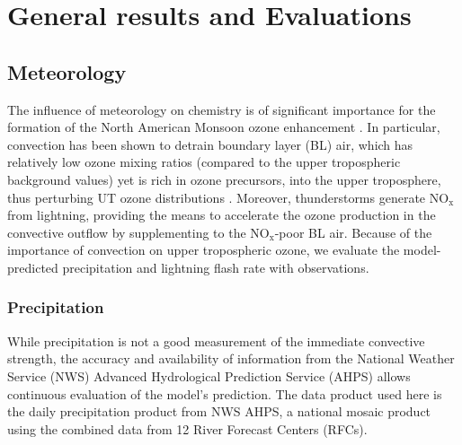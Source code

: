 \section{General results and Evaluations}\label{sect:results}

\subsection{Meteorology}\label{sect:val/met}

The influence of meteorology on chemistry is of significant importance for the formation of
the North American Monsoon ozone enhancement \citep{Li:2005ss,Cooper:2007cr,Barth:2012qf}.
In particular, convection has been shown to detrain boundary layer (BL) air, which has relatively low
ozone mixing ratios (compared to the upper tropospheric background values) yet is rich in ozone
precursors, into the upper troposphere, thus perturbing UT ozone distributions
\citep{Dickerson:1987hc,Kar:2004jl,Weinstock:2007yj}. Moreover, thunderstorms generate
NO$_\mathrm{x}$ from lightning, providing the means to accelerate the ozone production
in the convective outflow by supplementing to the NO$_\mathrm{x}$-poor BL air.
Because of the importance of convection on upper tropospheric ozone, we evaluate the
model-predicted precipitation and lightning flash rate with observations.

\subsubsection{Precipitation}

While precipitation is not a good measurement of the immediate convective strength, the
accuracy and availability of information from the National Weather Service (NWS) Advanced
Hydrological Prediction Service (AHPS) allows continuous evaluation of the model's
prediction. The data product used here is the daily precipitation product from NWS AHPS,
a national mosaic product using the combined data from 12 River Forecast Centers (RFCs).

